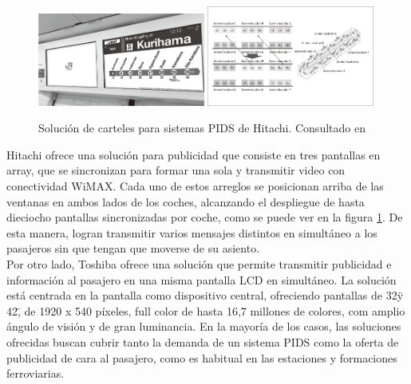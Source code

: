 \begin{figure}[h!]
	\centering
	\includegraphics[width=0.49\textwidth]{./Figures/HitachiCartelPIDS.png}
	\includegraphics[width=0.49\textwidth]{./Figures/HitachiDisplayArray.png}
	\caption{Solución de carteles para sistemas PIDS de Hitachi. Consultado en \citep{Hitachi}}
	\label{fig:Hitachi}
\end{figure}

Hitachi ofrece una solución para publicidad que consiste en tres pantallas en array, que se sincronizan para formar una sola y transmitir video con conectividad WiMAX. Cada uno de estos arreglos se posicionan arriba de las ventanas en ambos lados de los coches, alcanzando el despliegue de hasta dieciocho pantallas sincronizadas por coche, como se puede ver en la figura \ref{fig:Hitachi}. De esta manera, logran transmitir varios mensajes distintos en simultáneo a los pasajeros sin que tengan que moverse de su asiento.\\


Por otro lado, Toshiba ofrece una solución que permite transmitir publicidad e información al pasajero en una misma pantalla LCD en simultáneo. La solución está centrada en la pantalla como dispositivo central, ofreciendo pantallas de 32\" y 42\", de 1920 x 540 píxeles, full color de hasta 16,7 millones de colores, com amplio ángulo de visión y de gran luminancia\citep{Toshiba}. En la mayoría de los casos, las soluciones ofrecidas buscan cubrir tanto la demanda de un sistema PIDS como la oferta de publicidad de cara al pasajero, como es habitual en las estaciones y formaciones ferroviarias.\\



